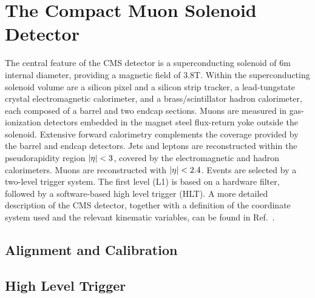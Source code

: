 \chapter{The Compact Muon Solenoid Detector}
\label{ch:cms}

The central feature of the CMS detector is a
superconducting solenoid of 6\unit{m} internal diameter, providing a
magnetic field of 3.8\unit{T}. Within the superconducting solenoid
volume are a silicon pixel and a silicon strip tracker, a
lead-tungstate crystal electromagnetic calorimeter, and a
brass/scintillator hadron calorimeter, each composed of a barrel and
two endcap sections. Muons are measured in gas-ionization detectors
embedded in the magnet steel flux-return yoke outside the
solenoid. Extensive forward calorimetry complements the coverage
provided by the barrel and endcap detectors. Jets and leptons are
reconstructed within the pseudorapidity region $\lvert \eta \rvert<3$, covered by the
electromagnetic and hadron calorimeters. Muons are reconstructed with
$\lvert \eta \rvert<2.4$. Events are selected by a
two-level trigger system. The first level (L1) is based on a hardware
filter, followed by a software-based high level trigger (HLT). A more
detailed description of the CMS detector, together with a definition
of the coordinate system used and the relevant kinematic variables,
can be found in Ref.~\cite{Adolphi:2008zzk}.

\section{Alignment and Calibration}
\section {High Level Trigger}
